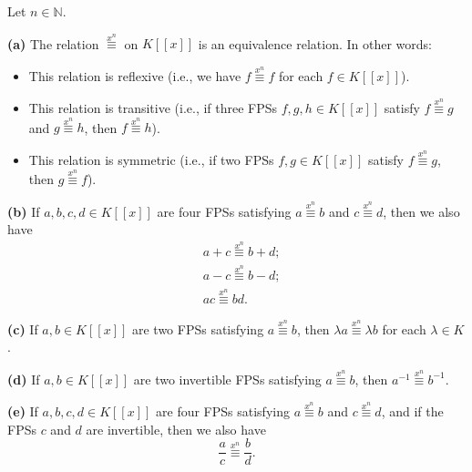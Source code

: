 \begin{theorem}
\label{thm.fps.xneq.props}Let $n\in\mathbb{N}$. \medskip

\textbf{(a)} The relation $\overset{x^{n}}{\equiv}$ on $K\left[  \left[
x\right]  \right]  $ is an equivalence relation. In other words:

\begin{itemize}
\item This relation is reflexive (i.e., we have $f\overset{x^{n}}{\equiv}f$
for each $f\in K\left[  \left[  x\right]  \right]  $).

\item This relation is transitive (i.e., if three FPSs $f,g,h\in K\left[
\left[  x\right]  \right]  $ satisfy $f\overset{x^{n}}{\equiv}g$ and
$g\overset{x^{n}}{\equiv}h$, then $f\overset{x^{n}}{\equiv}h$).

\item This relation is symmetric (i.e., if two FPSs $f,g\in K\left[  \left[
x\right]  \right]  $ satisfy $f\overset{x^{n}}{\equiv}g$, then
$g\overset{x^{n}}{\equiv}f$).
\end{itemize}

\textbf{(b)} If $a,b,c,d\in K\left[  \left[  x\right]  \right]  $ are four
FPSs satisfying $a\overset{x^{n}}{\equiv}b$ and $c\overset{x^{n}}{\equiv}d$,
then we also have%
\begin{align}
&  a+c\overset{x^{n}}{\equiv}b+d;\label{eq.thm.fps.xneq.props.b.+}\\
&  a-c\overset{x^{n}}{\equiv}b-d;\label{eq.thm.fps.xneq.props.b.-}\\
&  ac\overset{x^{n}}{\equiv}bd. \label{eq.thm.fps.xneq.props.b.*}%
\end{align}


\textbf{(c)} If $a,b\in K\left[  \left[  x\right]  \right]  $ are two FPSs
satisfying $a\overset{x^{n}}{\equiv}b$, then $\lambda a\overset{x^{n}}{\equiv
}\lambda b$ for each $\lambda\in K$. \medskip

\textbf{(d)} If $a,b\in K\left[  \left[  x\right]  \right]  $ are two
invertible FPSs satisfying $a\overset{x^{n}}{\equiv}b$, then $a^{-1}%
\overset{x^{n}}{\equiv}b^{-1}$. \medskip

\textbf{(e)} If $a,b,c,d\in K\left[  \left[  x\right]  \right]  $ are four
FPSs satisfying $a\overset{x^{n}}{\equiv}b$ and $c\overset{x^{n}}{\equiv}d$,
and if the FPSs $c$ and $d$ are invertible, then we also have%
\begin{equation}
\dfrac{a}{c}\overset{x^{n}}{\equiv}\dfrac{b}{d}.
\label{eq.thm.fps.xneq.props.e./}%
\end{equation}



\end{theorem}
